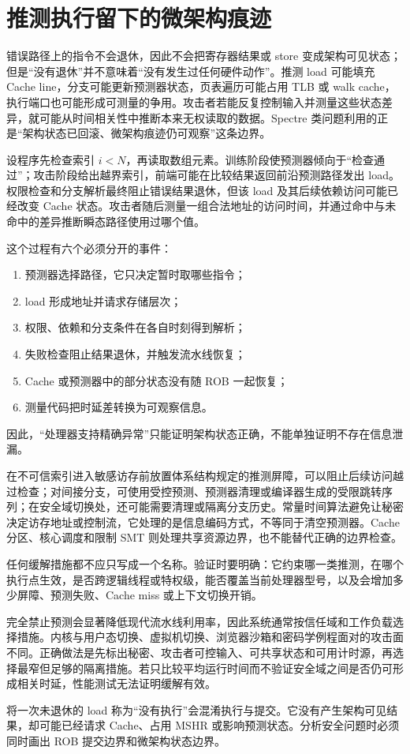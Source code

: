 \section{推测执行留下的微架构痕迹}

错误路径上的指令不会退休，因此不会把寄存器结果或 store 变成架构可见状态；但是“没有退休”并不意味着“没有发生过任何硬件动作”。推测 load 可能填充 Cache line，分支可能更新预测器状态，页表遍历可能占用 TLB 或 walk cache，执行端口也可能形成可测量的争用。攻击者若能反复控制输入并测量这些状态差异，就可能从时间相关性中推断本来无权读取的数据。Spectre 类问题利用的正是“架构状态已回滚、微架构痕迹仍可观察”这条边界。\cite{linux-speculation,linux-spectre}

设程序先检查索引 $i<N$，再读取数组元素。训练阶段使预测器倾向于“检查通过”；攻击阶段给出越界索引，前端可能在比较结果返回前沿预测路径发出 load。权限检查和分支解析最终阻止错误结果退休，但该 load 及其后续依赖访问可能已经改变 Cache 状态。攻击者随后测量一组合法地址的访问时间，并通过命中与未命中的差异推断瞬态路径使用过哪个值。

这个过程有六个必须分开的事件：

\begin{enumerate}[leftmargin=2.2em]
  \item 预测器选择路径，它只决定暂时取哪些指令；
  \item load 形成地址并请求存储层次；
  \item 权限、依赖和分支条件在各自时刻得到解析；
  \item 失败检查阻止结果退休，并触发流水线恢复；
  \item Cache 或预测器中的部分状态没有随 ROB 一起恢复；
  \item 测量代码把时延差转换为可观察信息。
\end{enumerate}

因此，“处理器支持精确异常”只能证明架构状态正确，不能单独证明不存在信息泄漏。

在不可信索引进入敏感访存前放置体系结构规定的推测屏障，可以阻止后续访问越过检查；对间接分支，可使用受控预测、预测器清理或编译器生成的受限跳转序列；在安全域切换处，还可能需要清理或隔离分支历史。常量时间算法避免让秘密决定访存地址或控制流，它处理的是信息编码方式，不等同于清空预测器。Cache 分区、核心调度和限制 SMT 则处理共享资源边界，也不能替代正确的边界检查。

任何缓解措施都不应只写成一个名称。验证时要明确：它约束哪一类推测，在哪个执行点生效，是否跨逻辑线程或特权级，能否覆盖当前处理器型号，以及会增加多少屏障、预测失败、Cache miss 或上下文切换开销。

完全禁止预测会显著降低现代流水线利用率，因此系统通常按信任域和工作负载选择措施。内核与用户态切换、虚拟机切换、浏览器沙箱和密码学例程面对的攻击面不同。正确做法是先标出秘密、攻击者可控输入、可共享状态和可用计时源，再选择最窄但足够的隔离措施。若只比较平均运行时间而不验证安全域之间是否仍可形成相关时延，性能测试无法证明缓解有效。

\begin{warningbox}
将一次未退休的 load 称为“没有执行”会混淆执行与提交。它没有产生架构可见结果，却可能已经请求 Cache、占用 MSHR 或影响预测状态。分析安全问题时必须同时画出 ROB 提交边界和微架构状态边界。
\end{warningbox}

